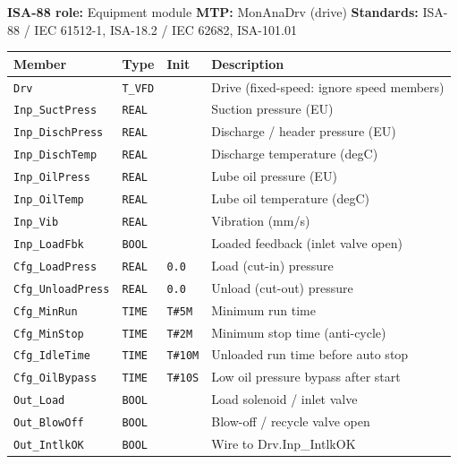 {\small\textbf{ISA-88 role:} Equipment module \quad \textbf{MTP:} MonAnaDrv (drive) \quad \textbf{Standards:} ISA-88 /\allowbreak{} IEC 61512-1, ISA-18.2 /\allowbreak{} IEC 62682, ISA-101.01}
{\footnotesize
\begin{longtable}{@{}>{\raggedright\arraybackslash}p{3.4cm}>{\raggedright\arraybackslash}p{3.3cm}>{\raggedright\arraybackslash}p{1.3cm}>{\raggedright\arraybackslash}p{6.4cm}@{}}
\toprule
\rowcolor{tblhead}\textbf{Member} & \textbf{Type} & \textbf{Init} & \textbf{Description} \\
\midrule
\endhead
\texttt{Drv} & \texttt{T\_VFD} &  & Drive (fixed-speed: ignore speed members) \\
\texttt{Inp\_SuctPress} & \texttt{REAL} &  & Suction pressure (EU) \\
\texttt{Inp\_DischPress} & \texttt{REAL} &  & Discharge /\allowbreak{} header pressure (EU) \\
\texttt{Inp\_DischTemp} & \texttt{REAL} &  & Discharge temperature (degC) \\
\texttt{Inp\_OilPress} & \texttt{REAL} &  & Lube oil pressure (EU) \\
\texttt{Inp\_OilTemp} & \texttt{REAL} &  & Lube oil temperature (degC) \\
\texttt{Inp\_Vib} & \texttt{REAL} &  & Vibration (mm/\allowbreak{}s) \\
\texttt{Inp\_LoadFbk} & \texttt{BOOL} &  & Loaded feedback (inlet valve open) \\
\texttt{Cfg\_LoadPress} & \texttt{REAL} & \texttt{0.0} & Load (cut-in) pressure \\
\texttt{Cfg\_UnloadPress} & \texttt{REAL} & \texttt{0.0} & Unload (cut-out) pressure \\
\texttt{Cfg\_MinRun} & \texttt{TIME} & \texttt{T\#5M} & Minimum run time \\
\texttt{Cfg\_MinStop} & \texttt{TIME} & \texttt{T\#2M} & Minimum stop time (anti-cycle) \\
\texttt{Cfg\_IdleTime} & \texttt{TIME} & \texttt{T\#10M} & Unloaded run time before auto stop \\
\texttt{Cfg\_OilBypass} & \texttt{TIME} & \texttt{T\#10S} & Low oil pressure bypass after start \\
\texttt{Out\_Load} & \texttt{BOOL} &  & Load solenoid /\allowbreak{} inlet valve \\
\texttt{Out\_BlowOff} & \texttt{BOOL} &  & Blow-off /\allowbreak{} recycle valve open \\
\texttt{Out\_IntlkOK} & \texttt{BOOL} &  & Wire to Drv.Inp\_IntlkOK \\

\end{longtable}}
